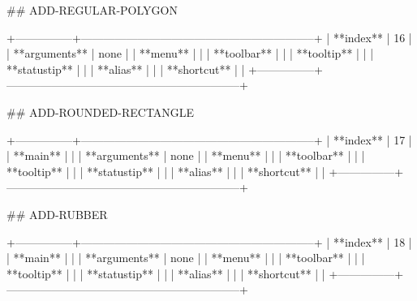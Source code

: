 ## ADD-REGULAR-POLYGON

+---------------+--------------------------------------------------------------+
| **index**     | 16                                                           |
| **arguments** | none                                                         |
| **menu**      |                                                              |
| **toolbar**   |                                                              |
| **tooltip**   |                                                              |
| **statustip** |                                                              |
| **alias**     |                                                              |
| **shortcut**  |                                                              |
+---------------+--------------------------------------------------------------+


## ADD-ROUNDED-RECTANGLE

+---------------+--------------------------------------------------------------+
| **index**     | 17                                                           |
| **main**      |                                                              |
| **arguments** | none                                                         |
| **menu**      |                                                              |
| **toolbar**   |                                                              |
| **tooltip**   |                                                              |
| **statustip** |                                                              |
| **alias**     |                                                              |
| **shortcut**  |                                                              |
+---------------+--------------------------------------------------------------+

## ADD-RUBBER

+---------------+--------------------------------------------------------------+
| **index**     | 18                                                           |
| **main**      |                                                              |
| **arguments** | none                                                         |
| **menu**      |                                                              |
| **toolbar**   |                                                              |
| **tooltip**   |                                                              |
| **statustip** |                                                              |
| **alias**     |                                                              |
| **shortcut**  |                                                              |
+---------------+--------------------------------------------------------------+


